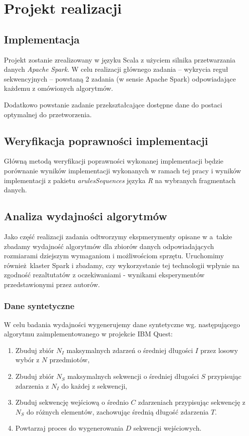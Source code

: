 \documentclass[paper=a4, fontsize=11pt]{scrartcl} %
\numberwithin{equation}{section} %
\numberwithin{figure}{section} %
\numberwithin{table}{section} %
\begin{document}
\section{Projekt realizacji}
\subsection{Implementacja}
Projekt zostanie zrealizowany w języku Scala z użyciem silnika przetwarzania danych \emph{Apache Spark}.
W celu realizacji głównego zadania -- wykrycia reguł sekwencyjnych -- powstaną 2 zadania (w sensie Apache Spark) odpowiadające każdemu z omówionych algorytmów.

Dodatkowo powstanie zadanie przekształcające dostępne dane do postaci optymalnej do przetworzenia.

\subsection{Weryfikacja poprawności implementacji}
Główną metodą weryfikacji poprawności wykonanej implementacji będzie porównanie wyników implementacji wykonanych w ramach tej pracy i wyników implementacji z pakietu \emph{arulesSequences} języka \emph{R} na wybranych fragmentach danych.

\subsection{Analiza wydajności algorytmów}
Jako część realizacji zadania odtworzymy ekspmerymenty opisane w \cite{spade}
a~także zbadamy wydajność algorytmów dla zbiorów danych odpowiadających rozmiarami
dziejszym wymaganiom i możliwościom sprzętu.  Uruchomimy również klaster Spark
i zbadamy, czy wykorzystanie tej technologii wpłynie na zgodność rezaltutatów z
oczekiwaniami - wynikami eksperymentów przedstawionymi przez autorów.

\subsubsection{Dane syntetyczne}
W celu badania wydajności wygenerujemy dane syntetyczne wg. następującego
algorytmu zaimplementowanego w projekcie IBM Quest:
\begin{enumerate}
    \item Zbuduj zbiór \( N_I \) maksymalnych zdarzeń o średniej długości \( I \)
          przez losowy wybór z \( N \) przedmiotów,
    \item Zbuduj zbiór \( N_S \) maksymalnych sekwencji o średniej długości \( S \)
          przypisując zdarzenia z \( N_I \) do każdej z sekwencji,
    \item Zbuduj sekwencję wejściową o średnio \( C \) zdarzeniach przypisując
          sekwencję z \( N_S \) do różnych elementów, zachowując średnią długość
          zdarzenia \( T \).
    \item Powtarzaj proces do wygenerowania \( D \) sekwencji wejściowych.
\end{enumerate}
\end{document}
